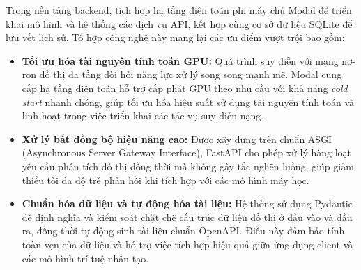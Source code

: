 Trong nền tảng backend, tích hợp hạ tầng điện toán phi máy chủ Modal để triển khai mô hình và hệ thống các dịch vụ API, kết hợp cùng cơ sở dữ liệu SQLite để lưu vết lịch sử. Tổ hợp công nghệ này mang lại các ưu điểm vượt trội bao gồm:
\begin{itemize}[label={--}, itemsep=1pt]
    \item \textbf{Tối ưu hóa tài nguyên tính toán GPU:} Quá trình suy diễn với mạng nơ-ron đồ thị đa tầng đòi hỏi năng lực xử lý song song mạnh mẽ. Modal cung cấp hạ tầng điện toán hỗ trợ cấp phát GPU theo nhu cầu với khả năng \textit{cold start} nhanh chóng, giúp tối ưu hóa hiệu suất sử dụng tài nguyên tính toán và linh hoạt trong việc triển khai các tác vụ suy diễn nặng.
    \item \textbf{Xử lý bất đồng bộ hiệu năng cao:} Được xây dựng trên chuẩn ASGI (Asynchronous Server Gateway Interface), FastAPI cho phép xử lý hàng loạt yêu cầu phân tích đồ thị đồng thời mà không gây tắc nghẽn luồng, giúp giảm thiểu tối đa độ trễ phản hồi khi tích hợp với các mô hình máy học.
    \item \textbf{Chuẩn hóa dữ liệu và tự động hóa tài liệu:} Hệ thống sử dụng Pydantic để định nghĩa và kiểm soát chặt chẽ cấu trúc dữ liệu đồ thị ở đầu vào và đầu ra, đồng thời tự động sinh tài liệu chuẩn OpenAPI. Điều này đảm bảo tính toàn vẹn của dữ liệu và hỗ trợ việc tích hợp hiệu quả giữa ứng dụng client và các mô hình trí tuệ nhân tạo.
\end{itemize}